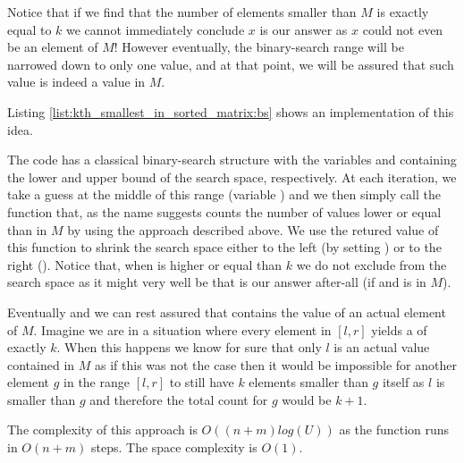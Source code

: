 Notice that if we find that the number of elements smaller than $M$ is exactly equal to $k$ we cannot immediately conclude $x$ is our answer as $x$ could not even be an element of $M$! However eventually, the binary-search range will be narrowed down to only one value, and at that point, we will be assured that such value is indeed a value in $M$.

Listing \ref{list:kth_smallest_in_sorted_matrix:bs} shows an implementation of this idea.



The code has a classical binary-search structure with the variables  and  containing the lower and upper bound of the search space, respectively. At each iteration, we take a guess at the middle of this range (variable ) and we then simply call the function  that, as the name suggests counts the number of values lower or equal than  in $M$ by using the approach described above.
We use the retured value of this function to shrink the search space either to the left (by setting ) or to the right (). Notice that, when  is higher or equal than $k$ we do not exclude  from the search space as it might very well be that  is our answer after-all (if  and  is in $M$).

Eventually  and we can rest assured that  contains the value of an actual element of $M$. 
Imagine we are in a situation where every element in $[l,r]$ yields a  of exactly $k$. When this happens we know for sure that only $l$ is an actual value contained in $M$ as if this was not the case then it would be impossible for another element $g$ in the range $[l,r]$ to still have $k$ elements smaller than $g$ itself as $l$ is smaller than $g$ and therefore the total count for $g$ would be $k+1$.

The complexity of this approach is $O((n+m)log(U))$ as the function  runs in $O(n+m)$ steps. The space complexity is $O(1)$.